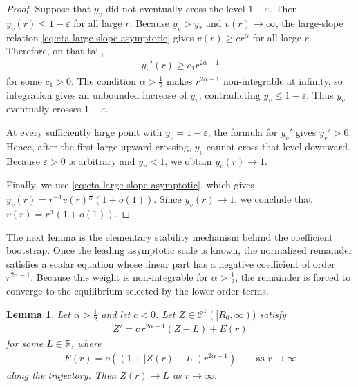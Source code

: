 \documentclass{amsart}
\theoremstyle{plain}
\newtheorem{lemma}[theorem]{Lemma}
\theoremstyle{mainintrothm}
\theoremstyle{definition}
\begin{document}
\begin{proof}
		Suppose that $y_v$ did not eventually cross the level $1-\varepsilon$.  Then
		$y_v(r)\le1-\varepsilon$ for all large $r$.  Because $y_v>y_*$ and
		$v(r)\to\infty$, the large-slope relation
		\eqref{eq:eta-large-slope-asymptotic} gives $v(r)\ge c r^\alpha$ for all
		large $r$.  Therefore, on that tail,
		\begin{align*}
			y_v'(r)
			\ge
			c_1 r^{2\alpha-1}
		\end{align*}
		for some $c_1>0$.  The condition $\alpha>\frac{1}{2}$ makes
		$r^{2\alpha-1}$ non-integrable at infinity, so integration gives an
		unbounded increase of $y_v$, contradicting $y_v\le1-\varepsilon$.
		Thus $y_v$ eventually crosses $1-\varepsilon$.
		
		At every sufficiently large point with $y_v=1-\varepsilon$, the formula
		for $y_v'$ gives $y_v'>0$.  Hence, after the first large upward
		crossing, $y_v$ cannot cross that level downward.  Because
		$\varepsilon>0$ is arbitrary and $y_v<1$, we obtain
		$y_v(r)\to1$.
		
		Finally, we use \eqref{eq:eta-large-slope-asymptotic}, which gives
		$y_v(r)=r^{-1}v(r)^{\frac{1}{\alpha}}(1+o(1))$.  Since
		$y_v(r)\to1$, we conclude that $v(r)=r^\alpha(1+o(1))$.
	\end{proof}
	
	The next lemma is the elementary stability mechanism behind the coefficient
	bootstrap.  Once the leading asymptotic scale is known, the normalized
	remainder satisfies a scalar equation whose linear part has a negative
	coefficient of order $r^{2\alpha-1}$.  Because this weight is non-integrable for
	$\alpha>\frac{1}{2}$, the remainder is forced to converge to the equilibrium
	selected by the lower-order terms.
	
	\begin{lemma}
		\label{lem:stable-scalar-bootstrap}
		Let $\alpha>\frac{1}{2}$ and let $c<0$.  Let
		$Z\in\mathcal C^1([R_0,\infty))$ satisfy
		\begin{align*}
			Z'
			=
			c\,r^{2\alpha-1}(Z-L)
			+
			E(r)
		\end{align*}
		for some $L\in\mathbb R$, where
		\begin{align*}
			E(r)
			=
			o\!\left((1+|Z(r)-L|)r^{2\alpha-1}\right)
			\qquad
			\text{as }r\to\infty
		\end{align*}
		along the trajectory.  Then $Z(r)\to L$ as $r\to\infty$.
	\end{lemma}
	
\end{document}
